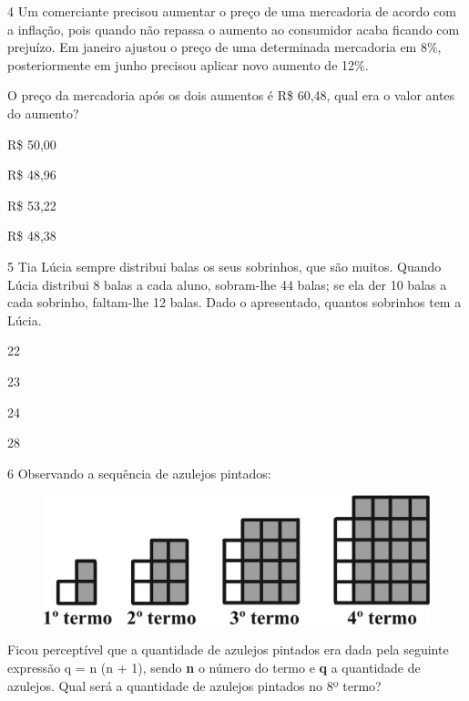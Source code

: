 \num{4} Um comerciante precisou aumentar o preço de uma mercadoria de acordo com a inflação, pois quando não repassa o aumento ao consumidor acaba ficando com prejuízo. Em janeiro ajustou o preço de uma determinada mercadoria em 8\%, posteriormente em junho precisou aplicar novo aumento de 12\%.

O preço da mercadoria após os dois aumentos é R\$ 60,48, qual era o
valor antes do aumento?

\begin{escolha}

\item
  R\$ 50,00
\item
  R\$ 48,96
\item
  R\$ 53,22
\item
  R\$ 48,38
\end{escolha}


\num{5} Tia Lúcia sempre distribui balas os seus sobrinhos, que são muitos. Quando Lúcia distribui 8 balas a cada aluno, sobram-lhe 44 balas; se ela der 10 balas a cada sobrinho, faltam-lhe 12 balas. Dado o apresentado, quantos sobrinhos tem a Lúcia.

\begin{multicols}{2}
\begin{escolha}
\item 22

\item 23

\item 24

\item 28
\end{escolha}
\end{multicols}

\num{6} Observando a sequência de azulejos pintados:

\begin{figure}[htpb!]
\centering
\includegraphics[width=\textwidth]{./ilustras-mat/Simulado_4-_atividade_6.png}
\end{figure}

Ficou perceptível que a quantidade de azulejos pintados era dada pela
seguinte expressão q = n \cdot (n + 1), sendo \textbf{n} o número do termo e
\textbf{q} a quantidade de azulejos. Qual será a quantidade de azulejos
pintados no 8º termo?

